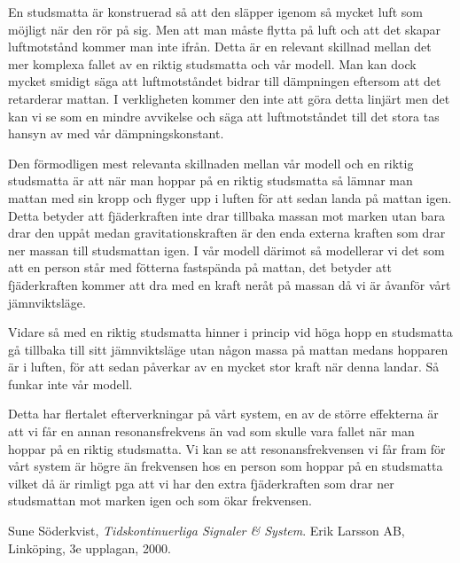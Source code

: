 \documentclass[10pt,a4paper]{article}
\begin{document}
En studsmatta är konstruerad så att den släpper igenom så mycket luft som möjligt när den rör på sig. Men att man måste flytta på luft och att det skapar luftmotstånd kommer man inte ifrån. Detta är en relevant skillnad mellan det mer komplexa fallet av en riktig studsmatta och vår modell. Man kan dock mycket smidigt säga att luftmotståndet bidrar till dämpningen eftersom att det retarderar mattan. I verkligheten kommer den inte att göra detta linjärt men det kan vi se som en mindre avvikelse och säga att luftmotståndet till det stora tas hansyn av med vår dämpningskonstant.

Den förmodligen mest relevanta skillnaden mellan vår modell och en riktig studsmatta är att när man hoppar på en riktig studsmatta så lämnar man mattan med sin kropp och flyger upp i luften för att sedan landa på mattan igen. Detta betyder att fjäderkraften inte drar tillbaka massan mot marken utan bara drar den uppåt medan gravitationskraften är den enda externa kraften som drar ner massan till studsmattan igen. I vår modell därimot så modellerar vi det som att en person står med fötterna fastspända på mattan, det betyder att fjäderkraften kommer att dra med en kraft neråt på massan då vi är åvanför vårt jämnviktsläge.

Vidare så med en riktig studsmatta hinner i princip vid höga hopp en studsmatta gå tillbaka till sitt jämnviktsläge utan någon massa på mattan medans hopparen är i luften, för att sedan påverkar av en mycket stor kraft när denna landar. Så funkar inte vår modell.

Detta har flertalet efterverkningar på vårt system, en av de större effekterna är att vi får en annan resonansfrekvens än vad som skulle vara fallet när man hoppar på en riktig studsmatta. Vi kan se att resonansfrekvensen vi får fram för vårt system är högre än frekvensen hos en person som hoppar på en studsmatta vilket då är rimligt pga att vi har den extra fjäderkraften som drar ner studsmattan mot marken igen och som ökar frekvensen.



\newpage

\begin{thebibliography}{9}

  Sune Söderkvist,
  \emph{Tidskontinuerliga Signaler \& System}.
  \linebreak
  Erik Larsson AB, Linköping,
  3e upplagan,
  2000.

\end{thebibliography}
\end{document}
